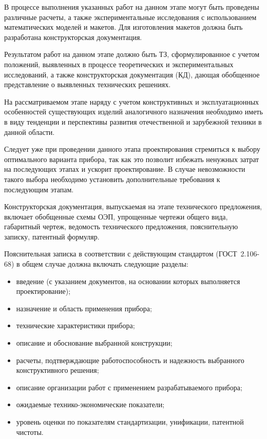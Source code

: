 В процессе выполнения указанных работ на данном этапе могут быть проведены различные расчеты, а также экспериментальные исследования с использованием математических моделей и макетов. Для изготовления макетов должна быть разработана конструкторская документация.

Результатом работ на данном этапе должно быть ТЗ, сформулированное с учетом положений, выявленных в процессе теоретических и экспериментальных исследований, а также конструкторская документация (КД), дающая обобщенное представление о выявленных технических решениях.

На рассматриваемом этапе наряду с учетом конструктивных и эксплуатационных особенностей существующих изделий аналогичного назначения необходимо иметь в виду тенденции и перспективы развития отечественной и зарубежной техники в данной области.

Следует уже при проведении данного этапа проектирования стремиться к выбору оптимального варианта прибора, так как это позволит избежать ненужных затрат на последующих этапах и ускорит проектирование. В случае невозможности такого выбора необходимо установить дополнительные требования к последующим этапам.

Конструкторская документация, выпускаемая на этапе технического предложения, включает обобщенные схемы ОЭП, упрощенные чертежи общего вида, габаритный чертеж, ведомость технического предложения, пояснительную записку, патентный формуляр.

Пояснительная записка в соответствии с действующим стандартом (ГОСТ~2.106-68) в общем случае должна включать следующие разделы:
\begin{itemize}
	\item введение (с указанием документов, на основании которых выполняется проектирование);
	\item назначение и область применения  прибора;
	\item технические характеристики прибора;
	\item описание и обоснование выбранной конструкции;
	\item расчеты, подтверждающие работоспособность и надежность выбранного конструктивного решения;
	\item описание организации работ с применением разрабатываемого прибора;
	\item ожидаемые технико-экономические показатели;
	\item уровень оценки по показателям стандартизации, унификации, патентной чистоты.
\end{itemize}

